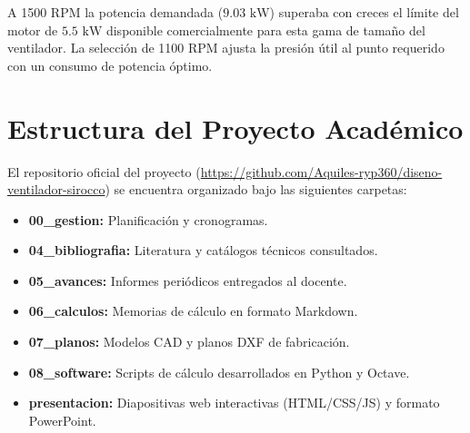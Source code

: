 \documentclass[12pt,a4paper]{article}
\begin{document}
A 1500 RPM la potencia demandada ($9.03\text{ kW}$) superaba con creces el límite del motor de $5.5\text{ kW}$ disponible comercialmente para esta gama de tamaño del ventilador. La selección de 1100 RPM ajusta la presión útil al punto requerido con un consumo de potencia óptimo.

\section{Estructura del Proyecto Académico}
El repositorio oficial del proyecto (\url{https://github.com/Aquiles-ryp360/diseno-ventilador-sirocco}) se encuentra organizado bajo las siguientes carpetas:
\begin{itemize}
    \item \textbf{00\_gestion:} Planificación y cronogramas.
    \item \textbf{04\_bibliografia:} Literatura y catálogos técnicos consultados.
    \item \textbf{05\_avances:} Informes periódicos entregados al docente.
    \item \textbf{06\_calculos:} Memorias de cálculo en formato Markdown.
    \item \textbf{07\_planos:} Modelos CAD y planos DXF de fabricación.
    \item \textbf{08\_software:} Scripts de cálculo desarrollados en Python y Octave.
    \item \textbf{presentacion:} Diapositivas web interactivas (HTML/CSS/JS) y formato PowerPoint.
\end{itemize}
\end{document}
